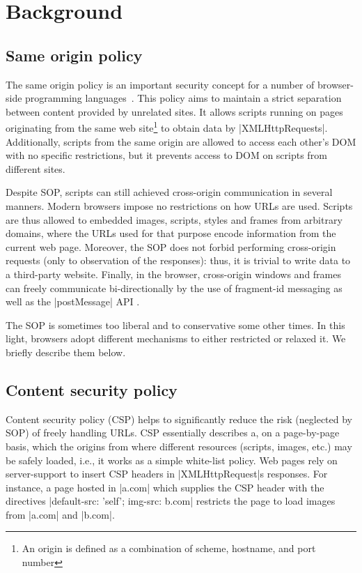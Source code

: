 \section{Background}
\label{sec:background}



\subsection {Same origin policy}

The same origin policy is an important security concept for a number of
browser-side programming languages~\tocite{}. This policy aims to maintain a strict
separation between content provided by unrelated sites. It allows scripts
running on pages originating from the same web site\footnote{An origin is 
defined as a combination of scheme, hostname, and port number} to obtain data
by \js|XMLHttpRequests|. Additionally, scripts from the same origin are allowed to
access each other's DOM with no specific restrictions, but it prevents access to
DOM on scripts from different sites. 

Despite SOP, scripts can still achieved cross-origin communication in several
manners. Modern browsers impose no restrictions on how URLs are used. Scripts
are thus allowed to embedded images, scripts, styles and frames from arbitrary
domains, where the URLs used for that purpose encode information from the
current web page. Moreover, the SOP does not forbid performing cross-origin
requests (only to observation of the responses): thus, it is trivial to write
data to a third-party website. Finally, in the browser, cross-origin windows and
frames can freely communicate bi-directionally by the use of fragment-id \tocite{}
messaging as well as the \js|postMessage| API \tocite{}.

The SOP is sometimes too liberal and to conservative some other times. In this
light, browsers adopt different mechanisms to either restricted or relaxed it.
We briefly describe them below. 

\subsection {Content security policy} 

Content security policy  (CSP) \tocite{} helps to significantly reduce
the risk (neglected by SOP) of freely handling URLs. CSP essentially describes
a, on a page-by-page basis, which the origins from where different resources
(scripts, images, etc.) may be safely loaded, i.e., it works as a simple
white-list policy.  Web pages rely on server-support to insert CSP headers in
\js|XMLHttpRequest|s responses. For instance, a page hosted in \js|a.com| 
which supplies the CSP header with the directives 
%
\js|default-src: ’self’; img-src: b.com| 
%
restricts the page to load images from \js|a.com| and \js|b.com|.



